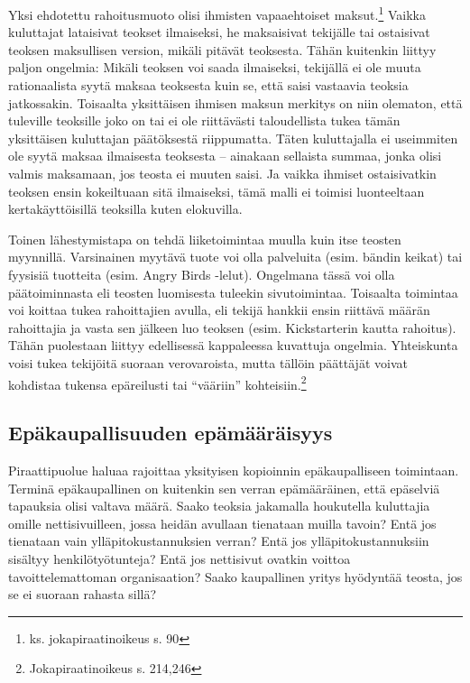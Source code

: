 \documentclass[titlepage,12pt]{article}
\begin{document}
Yksi ehdotettu rahoitusmuoto olisi ihmisten vapaaehtoiset
maksut.\footnote{ks. jokapiraatinoikeus s. 90} Vaikka kuluttajat
lataisivat teokset ilmaiseksi, he maksaisivat tekijälle tai ostaisivat
teoksen maksullisen version, mikäli pitävät teoksesta.  Tähän
kuitenkin liittyy paljon ongelmia: Mikäli teoksen voi saada
ilmaiseksi, tekijällä ei ole muuta rationaalista syytä maksaa
teoksesta kuin se, että saisi vastaavia teoksia jatkossakin.
Toisaalta yksittäisen ihmisen maksun merkitys on niin olematon, että
tuleville teoksille joko on tai ei ole riittävästi taloudellista tukea
tämän yksittäisen kuluttajan päätöksestä riippumatta.  Täten
kuluttajalla ei useimmiten ole syytä maksaa ilmaisesta teoksesta --
ainakaan sellaista summaa, jonka olisi valmis maksamaan, jos teosta ei
muuten saisi.  Ja vaikka ihmiset ostaisivatkin teoksen ensin
kokeiltuaan sitä ilmaiseksi, tämä malli ei toimisi luonteeltaan
kertakäyttöisillä teoksilla kuten elokuvilla.



Toinen lähestymistapa on tehdä liiketoimintaa muulla kuin itse teosten
myynnillä.  Varsinainen myytävä tuote voi olla palveluita
(esim. bändin keikat) tai fyysisiä tuotteita (esim. Angry Birds
-lelut).  Ongelmana tässä voi olla päätoiminnasta eli teosten
luomisesta tuleekin sivutoimintaa.  Toisaalta toimintaa voi koittaa
tukea rahoittajien avulla, eli tekijä hankkii ensin riittävä määrän
rahoittajia ja vasta sen jälkeen luo teoksen (esim. Kickstarterin
kautta rahoitus).  Tähän puolestaan liittyy edellisessä kappaleessa
kuvattuja ongelmia.  Yhteiskunta voisi tukea tekijöitä suoraan
verovaroista, mutta tällöin päättäjät voivat kohdistaa tukensa
epäreilusti tai ``vääriin'' kohteisiin.\footnote{Jokapiraatinoikeus
  s. 214,246}







\subsection{Epäkaupallisuuden epämääräisyys}

Piraattipuolue haluaa rajoittaa yksityisen kopioinnin epäkaupalliseen
toimintaan.  Terminä epäkaupallinen on kuitenkin sen verran
epämääräinen, että epäselviä tapauksia olisi valtava määrä.  Saako
teoksia jakamalla houkutella kuluttajia omille nettisivuilleen, jossa
heidän avullaan tienataan muilla tavoin? Entä jos tienataan vain
ylläpitokustannuksien verran?  Entä jos ylläpitokustannuksiin sisältyy
henkilötyötunteja?  Entä jos nettisivut ovatkin voittoa
tavoittelemattoman organisaation?  Saako kaupallinen yritys hyödyntää
teosta, jos se ei suoraan rahasta sillä?
\end{document}
